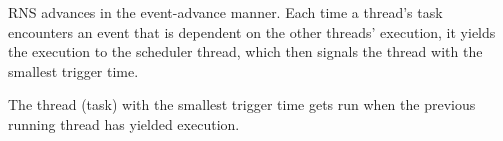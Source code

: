 RNS advances in the event-advance manner. Each time a thread's task encounters an event that is dependent on the other threads' execution, it yields the execution to the scheduler thread, which then signals the thread with the smallest trigger time.


The thread (task) with the smallest trigger time gets run when the previous running thread has yielded execution.



